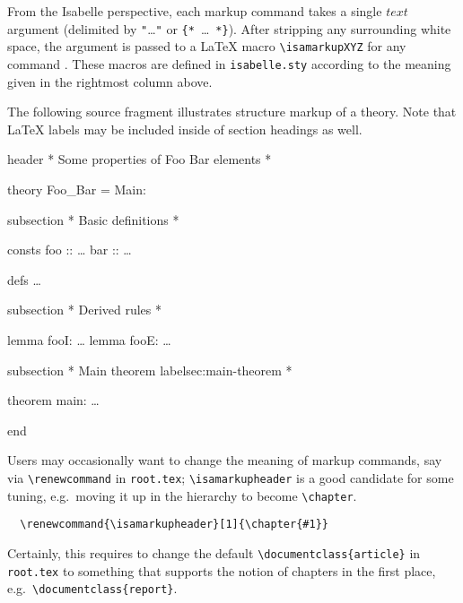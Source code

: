 \begin{isabellebody}
\begin{isamarkuptext}
  From the Isabelle perspective, each markup command takes a single
  $text$ argument (delimited by \verb,",\dots\verb,", or
  \verb,{,\verb,*,~\dots~\verb,*,\verb,},).  After stripping any
  surrounding white space, the argument is passed to a {\LaTeX} macro
  \verb,\isamarkupXYZ, for any command .  These macros
  are defined in \verb,isabelle.sty, according to the meaning given in
  the rightmost column above.

  \medskip The following source fragment illustrates structure markup
  of a theory.  Note that {\LaTeX} labels may be included inside of
  section headings as well.

  \begin{ttbox}
  header {\ttlbrace}* Some properties of Foo Bar elements *{\ttrbrace}

  theory Foo_Bar = Main:

  subsection {\ttlbrace}* Basic definitions *{\ttrbrace}

  consts
    foo :: \dots
    bar :: \dots

  defs \dots

  subsection {\ttlbrace}* Derived rules *{\ttrbrace}

  lemma fooI: \dots
  lemma fooE: \dots

  subsection {\ttlbrace}* Main theorem {\ttback}label{\ttlbrace}sec:main-theorem{\ttrbrace} *{\ttrbrace}

  theorem main: \dots

  end
  \end{ttbox}

  Users may occasionally want to change the meaning of markup
  commands, say via \verb,\renewcommand, in \texttt{root.tex};
  \verb,\isamarkupheader, is a good candidate for some tuning, e.g.\
  moving it up in the hierarchy to become \verb,\chapter,.

\begin{verbatim}
  \renewcommand{\isamarkupheader}[1]{\chapter{#1}}
\end{verbatim}

  \noindent Certainly, this requires to change the default
  \verb,\documentclass{article}, in \texttt{root.tex} to something
  that supports the notion of chapters in the first place, e.g.\
  \verb,\documentclass{report},.


\end{isamarkuptext}
\end{isabellebody}

